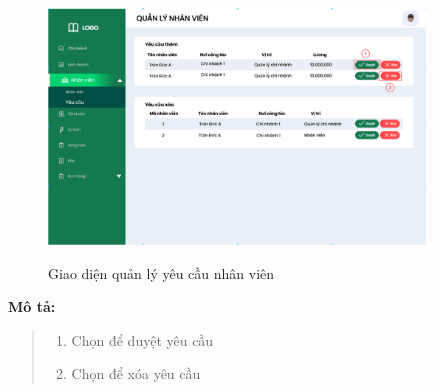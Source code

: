             \begin{figure}[!htp]
                \centering
                \includegraphics[width=10cm]{img/UI/admin/staff_request.png}
                \label{26}
                \newline
                \caption{Giao diện quản lý yêu cầu nhân viên}
            \end{figure}
            \textbf{Mô tả:}  
            \begin{quote}
                \begin{enumerate}
                    \item Chọn để duyệt yêu cầu
                    \item Chọn để xóa yêu cầu
                \end{enumerate}
            \end{quote}
        
